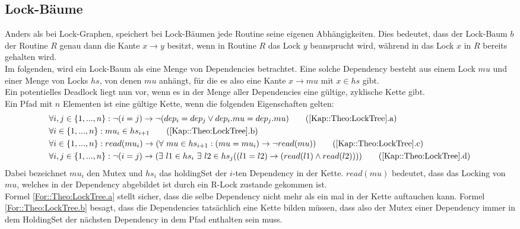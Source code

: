 \subsection{Lock-Bäume} \label{Kap::Theo:LockTree}
Anders als bei Lock-Graphen, speichert bei Lock-Bäumen jede Routine  
seine eigenen Abhängigkeiten. Dies bedeutet, dass der Lock-Baum $b$ der 
Routine $R$ genau dann die Kante $x\to y$ besitzt, wenn in Routine $R$ das 
Lock $y$ beansprucht wird, während in das Lock $x$ in $R$ bereits gehalten wird.\\
Im folgenden, wird ein Lock-Baum als eine Menge von Dependencies betrachtet. 
Eine solche Dependency besteht aus einem Lock $mu$ und einer Menge von Locks $hs$,
von denen $mu$ anhängt, für die es also eine Kante $x \to mu$ mit $x \in hs$ gibt.\\
Ein potentielles Deadlock liegt nun vor, wenn es in der Menge aller Dependencies
eine gültige, zyklische Kette gibt.\\
Ein Pfad mit $n$
Elementen ist eine gültige Kette, wenn die folgenden Eigenschaften gelten:
\begin{align}
  &\forall i, j \in \{1,...,n\}: \lnot (i = j) \rightarrow \lnot (dep_i = dep_j \lor dep_i.mu = 
  dep_j.mu) \tag{\ref{Kap::Theo:LockTree}.a}
  \label{For::Theo:LockTree.a}\\
  &\forall i \in \{1,...,n\}: mu_i \in hs_{i+1} 
  \tag{\ref{Kap::Theo:LockTree}.b}
  \label{For::Theo:LockTree.b}\\
  &\forall i \in \{1,...,n\}: read(mu_i) \rightarrow 
  (\forall\ mu \in hs_{i+1}:(mu = mu_i) \to \lnot read(mu))
  \tag{\ref{Kap::Theo:LockTree}.c}
  \label{For::Theo:LockTree.c}\\
  &\forall i, j \in \{1,...,n\}: \lnot (i = j) \rightarrow 
  (\exists\ l1 \in hs_i\ \exists\ l2 \in hs_j ((l1 = l2) \rightarrow 
  (read(l1) \land read(l2)))) 
  \tag{\ref{Kap::Theo:LockTree}.d}
  \label{For::Theo:LockTree.d}
\end{align}
Dabei bezeichnet $mu_i$ den Mutex und $hs_i$ das holdingSet der $i$-ten 
Dependency in der Kette. $read(mu)$ bedeutet, dass das Locking von $mu$, welches 
in der Dependency abgebildet ist durch ein R-Lock zustande gekommen ist.\\
Formel \ref{For::Theo:LockTree.a} stellt sicher, dass die selbe 
Dependency nicht mehr als ein mal in der Kette auftauchen kann. Formel 
\ref{For::Theo:LockTree.b} besagt, dass die Dependencies tatsächlich
eine Kette bilden müssen, dass also der Mutex einer Dependency immer in dem 
HoldingSet der nächsten Dependency in dem Pfad enthalten sein muss. 
